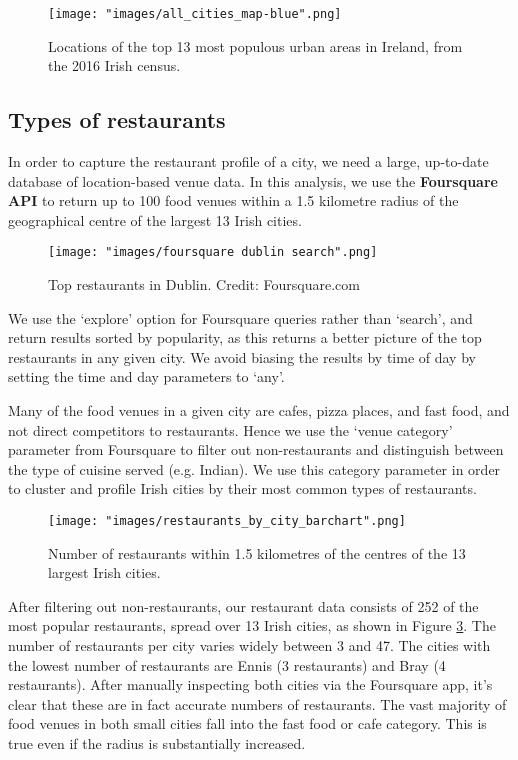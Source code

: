 \documentclass[a4paper,11pt]{article}
\begin{document}
\begin{figure}[htb]
   \centering
   \texttt{[image: "images/all\_cities\_map-blue".png]}
      \caption{Locations of the top 13 most populous urban areas in Ireland, from the 2016 Irish census.}
      \label{fig:map all cities}
\end{figure}


\subsection{Types of restaurants}\label{sec: restaurant data}
In order to capture the restaurant profile of a city, we need a large, up-to-date database of location-based venue data. In this analysis, we use the \textbf{Foursquare API} to return up to 100 food venues within a 1.5 kilometre radius of the geographical centre of the largest 13 Irish cities.

\begin{figure}[htb]
   \centering
   \texttt{[image: "images/foursquare dublin search".png]}
      \caption{Top restaurants in Dublin. Credit: Foursquare.com}
      \label{fig:dublin foursquare}
\end{figure}

We use the `explore' option for Foursquare queries rather than `search', and return results sorted by popularity, as this returns a better picture of the top restaurants in any given city. We avoid biasing the results by time of day by setting the time and day parameters to `any'.


Many of the food venues in a given city are cafes, pizza places, and fast food, and not direct competitors to restaurants. Hence we use the `venue category' parameter from Foursquare to filter out non-restaurants and distinguish between the type of cuisine served (e.g. Indian). We use this category parameter in order to cluster and profile Irish cities by their most common types of restaurants.

\begin{figure}[htb]
   \centering
   \texttt{[image: "images/restaurants\_by\_city\_barchart".png]}
      \caption{Number of restaurants within 1.5 kilometres of the centres of the 13 largest Irish cities. }
      \label{fig:restaurants}
\end{figure}

After filtering out non-restaurants, our restaurant data consists of 252 of the most popular restaurants, spread over 13 Irish cities, as shown in Figure \ref{fig:restaurants}. The number of restaurants per city varies widely between 3 and 47. The cities with the lowest number of restaurants are Ennis (3 restaurants) and Bray (4 restaurants). After manually inspecting both cities via the Foursquare app, it's clear that these are in fact accurate numbers of restaurants. The vast majority of food venues in both small cities fall into the fast food or cafe category. This is true even if the radius is substantially increased.
\end{document}

